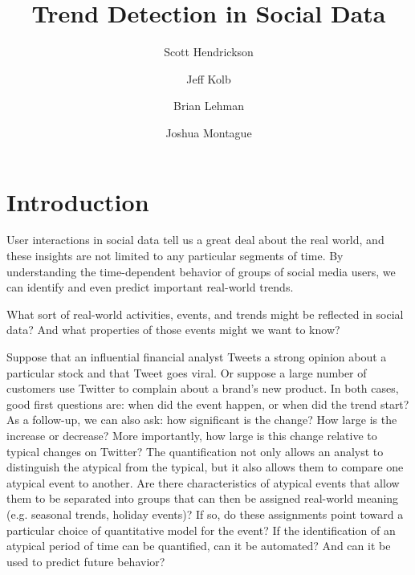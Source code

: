 \documentclass{article}
\title{Trend Detection in Social Data}
\author[]{Scott Hendrickson}
\author[]{Jeff Kolb}
\author[]{Brian Lehman}
\author[]{Joshua Montague}
\affil[]{ \Large{Twitter, Inc.} }
\begin{document}


\frenchspacing

\section{Introduction}
\label{intro}

User interactions in social data tell us a great deal about the real world, and
these insights are not limited to any particular segments of time. By
understanding the time-dependent behavior of groups of social media users, we
can identify and even predict important real-world trends.


What sort of real-world activities, events, and trends might be reflected in
social data? And what properties of those events might we want to know?

Suppose that an influential financial analyst Tweets a strong opinion about a
particular stock and that Tweet goes viral. Or suppose a large number of
customers use Twitter to complain about a brand’s new product. In both cases,
good first questions are: when did the event happen, or when did the trend
start? As a follow-up, we can also ask: how significant is the change?  How
large is the increase or decrease? More importantly, how large is this change
relative to typical changes on Twitter? The quantification not only allows an
analyst to distinguish the atypical from the typical, but it also allows them
to compare one atypical event to another. Are there characteristics of atypical
events that allow them to be separated into groups that can then be assigned
real-world meaning (e.g. seasonal trends, holiday events)? If so, do these
assignments point toward a particular choice of quantitative model for the
event? If the identification of an atypical period of time can be quantified,
can it be automated? And can it be used to predict future behavior?
\end{document}
